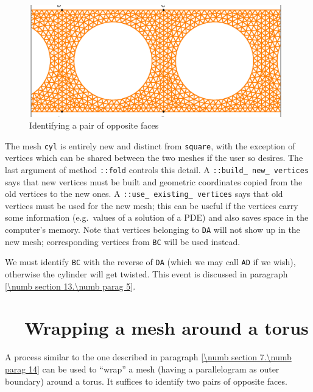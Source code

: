 \begin{figure}[ht] \centering
  \includegraphics[width=110mm]{cylinder-1.eps}
  \caption{Identifying a pair of opposite faces}
  \label{\numb section 7.\numb fig 10}
\end{figure}

The mesh {\small\tt cyl} is entirely new and distinct from {\small\tt square},
with the exception of vertices which can be shared between the two meshes if the
user so desires.
The last argument of method {\small\tt{}::fold} controls this detail.
A {\small\tt{}::build\_\,new\_\,vertices} says that new vertices must be built
and geometric coordinates copied from the old vertices to the new ones.
A {\small\tt{}::use\_\,existing\_\,vertices} says that old vertices must be used
for the new mesh; this can be useful if the vertices carry some information
(e.g.\ values of a solution of a PDE) and also saves space in the computer's memory.
Note that vertices belonging to {\small\tt DA} will not show up in the
new mesh; corresponding vertices from {\small\tt BC} will be used instead.

We must identify {\small\tt BC} with the reverse of {\small\tt DA} (which we may call
{\small\tt AD} if we wish), otherwise the cylinder will get twisted.
This event is discussed in paragraph \ref{\numb section 13.\numb parag 5}.


\section{~~Wrapping a mesh around a torus}\label{\numb section 7.\numb parag 15}

A process similar to the one described in paragraph \ref{\numb section 7.\numb parag 14}
can be used to ``wrap'' a mesh (having a parallelogram as outer boundary) around
a torus.
It suffices to identify two pairs of opposite faces.

